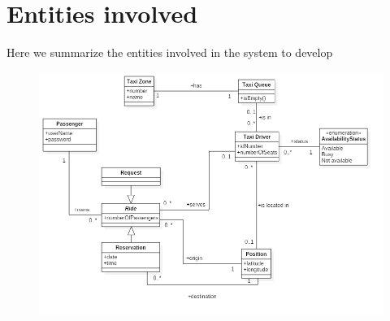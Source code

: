 \pagebreak
\section{Entities involved}
Here we summarize the entities involved in the system to develop
\begin{figure}[H]
\centering
\includegraphics[scale=0.5]{Images/class_diagram}
\end{figure}
